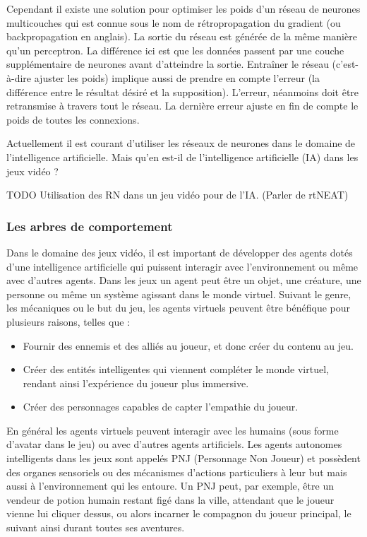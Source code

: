 \documentclass[a4paper, 12pt]{article} %
\begin{document}
Cependant il existe une solution pour optimiser les poids d’un réseau de neurones multicouches qui est connue sous le nom de rétropropagation du gradient (ou backpropagation en anglais). La sortie du réseau est générée de la même manière qu’un perceptron. La différence ici est que les données passent par une couche supplémentaire de neurones avant d’atteindre la sortie. Entraîner le réseau (c’est-à-dire ajuster les poids) implique aussi de prendre en compte l’erreur (la différence entre le résultat désiré et la supposition). L’erreur, néanmoins doit être retransmise à travers tout le réseau. La dernière erreur ajuste en fin de compte le poids de toutes les connexions.

Actuellement il est courant d’utiliser les réseaux de neurones dans le domaine de l’intelligence artificielle. Mais qu’en est-il de l’intelligence artificielle (IA) dans les jeux vidéo ?

TODO Utilisation des RN dans un jeu vidéo pour de l’IA. (Parler de rtNEAT\cite{stanley2005evolving})

\newpage
\subsubsection{Les arbres de comportement}

Dans le domaine des jeux vidéo, il est important de développer des agents dotés d’une intelligence artificielle qui puissent interagir avec l’environnement ou même avec d’autres agents. Dans les jeux un agent peut être un objet, une créature, une personne ou même un système agissant dans le monde virtuel. Suivant le genre, les mécaniques ou le but du jeu, les agents virtuels peuvent être bénéfique pour plusieurs raisons, telles que :

\begin{itemize}
	\item Fournir des ennemis et des alliés au joueur, et donc créer du contenu au jeu.
	\item Créer des entités intelligentes qui viennent compléter le monde virtuel, rendant ainsi l’expérience du joueur plus immersive.
	\item Créer des personnages capables de capter l’empathie du joueur.
\end{itemize}

En général les agents virtuels peuvent interagir avec les humains (sous forme d’avatar dans le jeu) ou avec d’autres agents artificiels. Les agents autonomes intelligents dans les jeux sont appelés PNJ (Personnage Non Joueur) et possèdent des organes sensoriels ou des mécanismes d’actions particuliers à leur but mais aussi à l’environnement qui les entoure. Un PNJ peut, par exemple, être un vendeur de potion humain restant figé dans la ville, attendant que le joueur vienne lui cliquer dessus, ou alors incarner le compagnon du joueur principal, le suivant ainsi durant toutes ses aventures.
\end{document}
